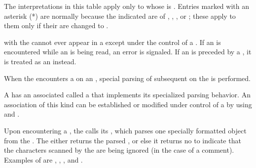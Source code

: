 The interpretations in this table apply only to 
whose  is .
Entries marked with an asterisk (*) are normally  
because the indicated  are of 
,
,
,
or ;
these  apply to them only if their  
are changed to .

\endsubsubsection%

\endsubsubsection%
 

 with the   
cannot ever appear in a  
except under the control of a  .
If an   is encountered while an  is
being read, an error  is signaled.
If an   is preceded by a  ,
it is treated as an   instead.

\endsubsubsection%


When the  encounters a  
on an  ,
special parsing of subsequent  
on the   
is performed.

A  has an associated 
called a  that implements its specialized parsing behavior.
An association of this kind can be established or modified under control of
a  by using 
 and .

Upon encountering a , the  calls its
, which parses one specially formatted object 
from the  .
The  either returns the parsed ,
or else it returns no  
    to indicate that the characters scanned by the 
    are being ignored (\eg in the case of a comment).
Examples of 
are , , , and 
.

